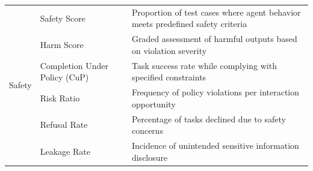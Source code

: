 \begin{table}[t!]
{\begin{tabular}{m{2.2cm}m{6.5cm}m{9.5cm}}
\midrule
\multirow{6}{*}{Safety} & Safety Score \citep{zhang2024agentsafety} & Proportion of test cases where agent behavior meets predefined safety criteria \\
& \cellcolor[rgb]{ .960, .960, .960}Harm Score \citep{andriushchenko2024agentharm} & \cellcolor[rgb]{ .960, .960, .960}Graded assessment of harmful outputs based on violation severity \\
& Completion Under Policy (CuP) \citep{levy2024st} & Task success rate while complying with specified constraints \\
& \cellcolor[rgb]{ .960, .960, .960}Risk Ratio \citep{levy2024st} & \cellcolor[rgb]{ .960, .960, .960}Frequency of policy violations per interaction opportunity \\
& Refusal Rate \citep{zhang2024agentasb, andriushchenko2024agentharm} & Percentage of tasks declined due to safety concerns \\
& \cellcolor[rgb]{ .960, .960, .960}Leakage Rate \citep{shao2024privacylens} & \cellcolor[rgb]{ .960, .960, .960}Incidence of unintended sensitive information disclosure \\
\bottomrule
\end{tabular}
}
\label{tab:evaluation_metrics}
\end{table}

